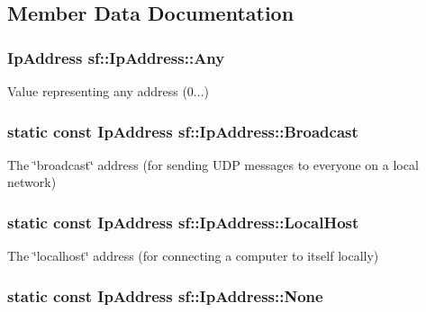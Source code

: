 \subsection{Member Data Documentation}
\hypertarget{classsf_1_1_ip_address_a3dbc10b0dc6804cc69e29342f7406907}{
\subsubsection[{Any}]{ {\bf Ip\-Address} sf\-::\-Ip\-Address\-::\-Any\hspace{0.3cm}{\ttfamily [static]}}}\label{classsf_1_1_ip_address_a3dbc10b0dc6804cc69e29342f7406907}


Value representing any address (0...) 

\hypertarget{classsf_1_1_ip_address_aefb978156901e01e2d9642815be10abe}{
\subsubsection[{Broadcast}]{\setlength{\rightskip}{0pt plus 5cm}static {\bf const} {\bf Ip\-Address} sf\-::\-Ip\-Address\-::\-Broadcast\hspace{0.3cm}{\ttfamily [static]}}}\label{classsf_1_1_ip_address_aefb978156901e01e2d9642815be10abe}


The \char`\"{}broadcast\char`\"{} address (for sending U\-D\-P messages to everyone on a local network) 

\hypertarget{classsf_1_1_ip_address_ac545220c940d381c677113841a218bda}{
\subsubsection[{Local\-Host}]{\setlength{\rightskip}{0pt plus 5cm}static {\bf const} {\bf Ip\-Address} sf\-::\-Ip\-Address\-::\-Local\-Host\hspace{0.3cm}{\ttfamily [static]}}}\label{classsf_1_1_ip_address_ac545220c940d381c677113841a218bda}


The \char`\"{}localhost\char`\"{} address (for connecting a computer to itself locally) 

\hypertarget{classsf_1_1_ip_address_af95b0353e632372b5266d6227bc0e3ec}{
\subsubsection[{None}]{\setlength{\rightskip}{0pt plus 5cm}static {\bf const} {\bf Ip\-Address} sf\-::\-Ip\-Address\-::\-None\hspace{0.3cm}{\ttfamily [static]}}}\label{classsf_1_1_ip_address_af95b0353e632372b5266d6227bc0e3ec}


